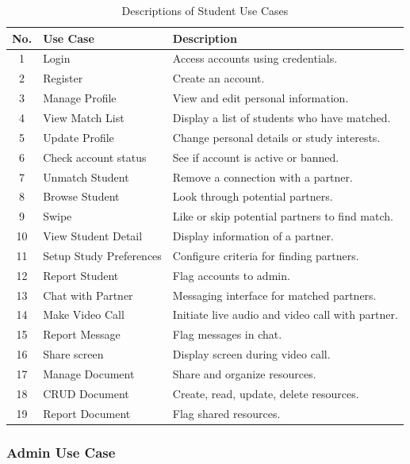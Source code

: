 \documentclass[a4paper,12pt]{report}
\begin{document}
\begin{table}[H]
\centering
\begin{tabular}{|c|p{5cm}|p{8cm}|}
\hline
\textbf{No.} & \textbf{Use Case} & \textbf{Description} \\ \hline
1 & Login & Access accounts using credentials. \\ \hline
2 & Register & Create an account. \\ \hline
3 & Manage Profile & View and edit personal information. \\ \hline
4 & View Match List & Display a list of students who have matched. \\ \hline
5 & Update Profile & Change personal details or study interests. \\ \hline
6 & Check account status & See if account is active or banned. \\ \hline
7 & Unmatch Student & Remove a connection with a partner. \\ \hline
8 & Browse Student & Look through potential partners. \\ \hline
9 & Swipe & Like or skip potential partners to find match. \\ \hline
10 & View Student Detail & Display information of a partner. \\ \hline
11 & Setup Study Preferences & Configure criteria for finding partners. \\ \hline
12 & Report Student & Flag accounts to admin. \\ \hline
13 & Chat with Partner & Messaging interface for matched partners. \\ \hline
14 & Make Video Call & Initiate live audio and video call with partner. \\ \hline
15 & Report Message & Flag messages in chat. \\ \hline
16 & Share screen & Display screen during video call. \\ \hline
17 & Manage Document & Share and organize resources. \\ \hline
18 & CRUD Document & Create, read, update, delete resources. \\ \hline
19 & Report Document & Flag shared resources. \\ \hline
\end{tabular}
\caption{Descriptions of Student Use Cases}
\label{tab:student_use_cases}
\end{table}

\subsubsection{Admin Use Case}
\end{document}
